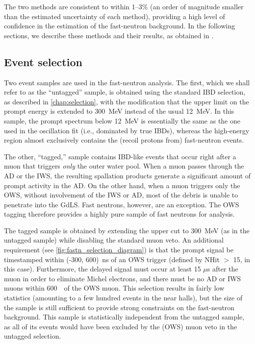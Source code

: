 \documentclass[../thesis.tex]{subfiles}
\begin{document}
The two methods are consistent to within 1--3\% (an order of magnitude smaller than the estimated uncertainty of each method), providing a high level of confidence in the estimation of the fast-neutron background. In the following sections, we describe these methods and their results, as obtained in \cite{fastn}.

\subsection{Event selection}
\label{sec:fastn_sel}

Two event samples are used in the fast-neutron analysis. The first, which we shall refer to as the ``untagged'' sample, is obtained using the standard IBD selection, as described in \autoref{chap:selection}, with the modification that the upper limit on the prompt energy is extended to 300~MeV instead of the usual 12~MeV. In this sample, the prompt spectrum below 12~MeV is essentially the same as the one used in the oscillation fit (i.e., dominated by true IBDs), whereas the high-energy region almost exclusively contains the (recoil protons from) fast-neutron events.

The other, ``tagged,'' sample contains IBD-like events that occur right after a muon that triggers \emph{only} the outer water pool. When a muon passes through the AD or the IWS, the resulting spallation products generate a significant amount of prompt activity in the AD. On the other hand, when a muon triggers only the OWS, without involvement of the IWS or AD, most of the debris is unable to penetrate into the GdLS. Fast neutrons, however, are an exception. The OWS tagging therefore provides a highly pure sample of fast neutrons for analysis.

The tagged sample is obtained by extending the upper cut to 300~MeV (as in the untagged sample) while disabling the standard muon veto. An additional requirement (see \autoref{fig:fastn_selection_diagram}) is that the prompt signal be timestamped within (-300, 600)~ns of an OWS trigger (defined by NHit $>$ 15, in this case). Furthermore, the delayed signal must occur at least 15 $\mu$s after the muon in order to eliminate Michel electrons, and there must be no AD or IWS muons within 600~\us\ of the OWS muon. This selection results in fairly low statistics (amounting to a few hundred events in the near halls), but the size of the sample is still sufficient to provide strong constraints on the fast-neutron background. This sample is statistically independent from the untagged sample, as all of its events would have been excluded by the (OWS) muon veto in the untagged selection.
\end{document}
